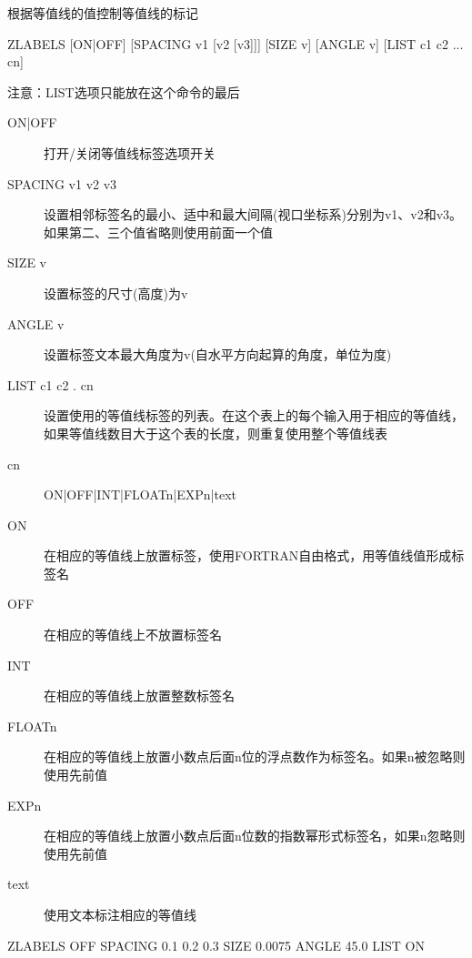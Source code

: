 \label{cmd:zlabels}

根据等值线的值控制等值线的标记

\begin{SACSTX}
ZLABELS [ON|OFF] [SPACING v1 [v2 [v3]]] [SIZE v]
    [ANGLE v] [LIST c1 c2 ... cn]
\end{SACSTX}
注意：LIST选项只能放在这个命令的最后

\begin{description}
\item [ON|OFF] 打开/关闭等值线标签选项开关
\item [SPACING v1 v2 v3] 设置相邻标签名的最小、适中和最大间隔(视口坐标系)分别为v1、v2和v3。如果第二、三个值省略则使用前面一个值
\item [SIZE v] 设置标签的尺寸(高度)为v
\item [ANGLE v] 设置标签文本最大角度为v(自水平方向起算的角度，单位为度)
\item [LIST c1 c2 . cn] 设置使用的等值线标签的列表。在这个表上的每个输入用于相应的等值线，如果等值线数目大于这个表的长度，则重复使用整个等值线表
\item [cn]  ON|OFF|INT|FLOATn|EXPn|text
\item [ON] 在相应的等值线上放置标签，使用FORTRAN自由格式，用等值线值形成标签名
\item [OFF] 在相应的等值线上不放置标签名
\item [INT] 在相应的等值线上放置整数标签名
\item [FLOATn] 在相应的等值线上放置小数点后面n位的浮点数作为标签名。如果n被忽略则使用先前值
\item [EXPn] 在相应的等值线上放置小数点后面n位数的指数幂形式标签名，如果n忽略则使用先前值
\item [text] 使用文本标注相应的等值线
\end{description}

\begin{SACDFT}
ZLABELS  OFF  SPACING 0.1 0.2 0.3  SIZE  0.0075 ANGLE 45.0  LIST ON
\end{SACDFT}

